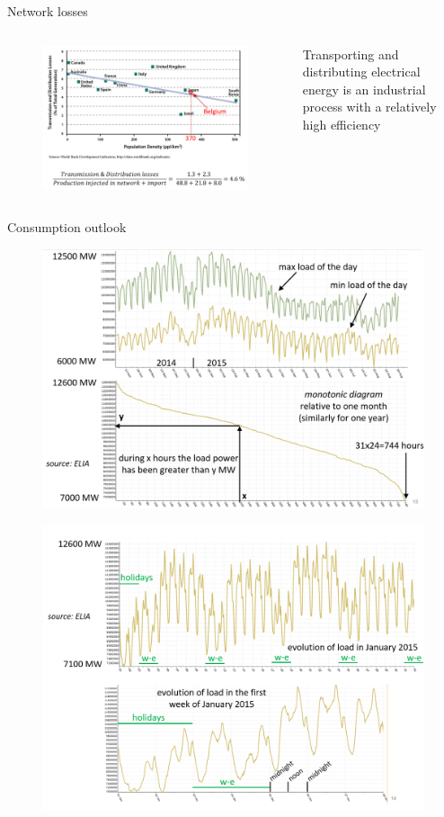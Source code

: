 \begin{frame}{Network losses}

\begin{columns}
    \begin{column}{0.55\textwidth}
      \begin{figure}
      \centering
      \includegraphics[width=0.6\linewidth]{images/network_losses_world.png}
      \end{figure}
    \end{column}
    \begin{column}{0.45\textwidth}
      Transporting and distributing electrical energy is an industrial process with a relatively high efficiency
    \end{column}
\end{columns}
\end{frame}

\begin{frame}
{Consumption outlook}
\begin{figure}
\centering
\includegraphics[width=0.6\linewidth]{images/consumption_be.png}
\end{figure}
\end{frame}

\begin{frame}
\begin{figure}
\centering
\includegraphics[width=0.6\linewidth]{images/consumption_be_zoom.png}
\end{figure}
\end{frame}

